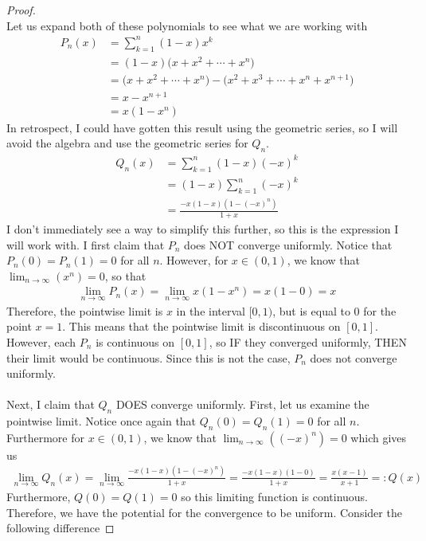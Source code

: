 \documentclass[10pt,a4paper]{article}
\theoremstyle{definition}
\theoremstyle{definition}
\numberwithin{equation}{section}
\begin{document}
\begin{proof}$ $
\\Let us expand both of these polynomials to see what we are working with
\begin{align*}
P_n(x) &= \sum_{k = 1}^n (1 - x)x^k\\
&= (1 - x)\bigg(x + x^2 + \cdots + x^n\bigg)\\
&= \bigg(x + x^2 + \cdots + x^n\bigg) - \bigg(x^2 + x^3 + \cdots + x^n + x^{n+1}\bigg)\\
&= x - x^{n+1}\\
&= x(1 - x^n)
\end{align*}
In retrospect, I could have gotten this result using the geometric series, so I will avoid the algebra and use the geometric series for $Q_n$. 
\begin{align*}
Q_n(x) &= \sum_{k = 1}^n (1 - x)(-x)^k\\
&= (1 - x)\sum_{k = 1}^n (-x)^k\\
&= \frac{-x(1 - x)(1 - (-x)^n)}{1 + x}
\end{align*}
I don't immediately see a way to simplify this further, so this is the expression I will work with. I first claim that $P_n$ does NOT converge uniformly. Notice that $P_n(0) = P_n(1) = 0$ for all $n$. However, for $x \in (0, 1)$, we know that $\lim_{n \to \infty} (x^n) = 0$, so that 
\begin{align*}
\lim_{n \to \infty} P_n(x) = \lim_{n \to \infty} x(1 - x^n) = x(1 - 0) = x
\end{align*}
Therefore, the pointwise limit is $x$ in the interval $[0, 1)$, but is equal to $0$ for the point $x = 1$. This means that the pointwise limit is discontinuous on $[0, 1]$. However, each $P_n$ is continuous on $[0, 1]$, so IF they converged uniformly, THEN their limit would be continuous. Since this is not the case, $P_n$ does not converge uniformly. 
\\
\\Next, I claim that $Q_n$ DOES converge uniformly. First, let us examine the pointwise limit. Notice once again that $Q_n(0) = Q_n(1) = 0$ for all $n$. Furthermore for $x \in (0, 1)$, we know that $\lim_{n \to \infty} ((-x)^n) = 0$ which gives us
\begin{align*}
\lim_{n \to \infty} Q_n(x) = \lim_{n \to \infty} \frac{-x(1 - x)(1 - (-x)^n)}{1 + x} = \frac{-x(1 - x)(1 - 0)}{1 + x} = \frac{x(x - 1)}{x + 1} =: Q(x)
\end{align*}
Furthermore, $Q(0) = Q(1) = 0$ so this limiting function is continuous. Therefore, we have the potential for the convergence to be uniform. Consider the following difference

\end{proof}
\end{document}
